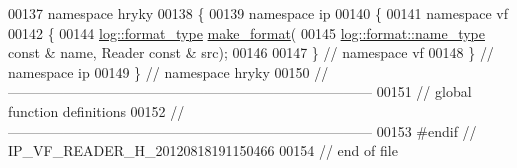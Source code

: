 \begin{DoxyCode}
00137 \textcolor{keyword}{namespace }hryky
00138 \{
00139 \textcolor{keyword}{namespace }ip
00140 \{
00141 \textcolor{keyword}{namespace }vf
00142 \{
00144     \hyperlink{namespacehryky_1_1log_ad50448c3f934f1eacd5c1bcffe8111e1}{log::format_type} \hyperlink{namespacehryky_afd615217f648ff164bc40fb82166d959}{make_format}(
00145         \hyperlink{namespacehryky_1_1log_1_1format_ab7408d1e2ed2d648dbf9bba69eb74288}{log::format::name_type} \textcolor{keyword}{const} & name, Reader \textcolor{keyword}{const} & src);
00146 
00147 \} \textcolor{comment}{// namespace vf}
00148 \} \textcolor{comment}{// namespace ip}
00149 \} \textcolor{comment}{// namespace hryky}
00150 \textcolor{comment}{//
      ------------------------------------------------------------------------------}
00151 \textcolor{comment}{// global function definitions}
00152 \textcolor{comment}{//
      ------------------------------------------------------------------------------}
00153 \textcolor{preprocessor}{#endif // IP\_VF\_READER\_H\_20120818191150466}
00154 \textcolor{preprocessor}{}\textcolor{comment}{// end of file}
\end{DoxyCode}
